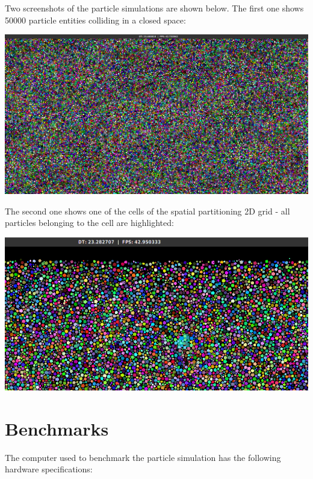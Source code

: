 \documentclass[twoside, 12pt, a4paper, openright]{book}
\let\origfigure=\figure
\let\endorigfigure=\endfigure
\renewenvironment{figure}[1][]{%
\origfigure[H]
}{%
\endorigfigure
}
\begin{document}
Two screenshots of the particle simulations are shown below. The first
one shows 50000 particle entities colliding in a closed space:

\begin{figure}[htbp]
\centering
\includegraphics{source/figures/bench/sc0.png}
\caption{Particle simulation: screenshot - 50000 colliding particles}
\end{figure}

The second one shows one of the cells of the spatial partitioning 2D
grid - all particles belonging to the cell are highlighted:

\begin{figure}[htbp]
\centering
\includegraphics{source/figures/bench/sc1.png}
\caption{Particle simulation: screenshot - spatial partitioning cell}
\end{figure}

\section{Benchmarks}\label{benchmarks}

The computer used to benchmark the particle simulation has the following
hardware specifications:
\end{document}
